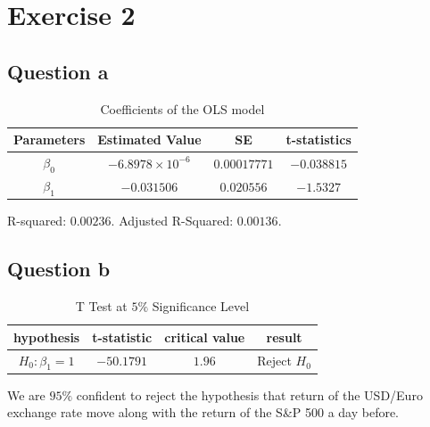 \documentclass{report}
\begin{document}


\section*{Exercise 2}

\subsection*{Question a}

 \begin{table}[H]
	\begin{center}
		\caption{Coefficients of the OLS model}
		\label{tab:table3}
		\vspace{2mm}
		\begin{tabular}{c|c|c|c|} 
			
			
			\textbf{Parameters} & \textbf{Estimated Value}&  \textbf{SE}& \textbf{t-statistics}\\
			\hline
			
			$\beta_0$ &  $-6.8978\times 10^{-6}$& $0.00017771$&$-0.038815$    \\
			$\beta_1$ &  $-0.031506$& $0.020556$&$-1.5327$    \\
		\end{tabular}
	\end{center}
\end{table}
R-squared: $0.00236$.  Adjusted R-Squared: $0.00136$.



\subsection*{Question b}

 \begin{table}[H]
	\begin{center}
		\caption{T Test at $5\%$ Significance Level}
		\label{tab:table4}
		\vspace{2mm}
		\begin{tabular}{c|c|c|c|} 
			
			
			\textbf{hypothesis} & \textbf{t-statistic}&  \textbf{critical value}& \textbf{result}\\
			\hline
			$H_0:\beta_1=1$ &  $-50.1791$& $1.96$& Reject $H_0$    \\
		\end{tabular}
	\end{center}
\end{table}
We are $95\%$ confident to reject the hypothesis that return of the USD/Euro exchange rate move along with the return of the S\&P 500 a day before.
\end{document}

